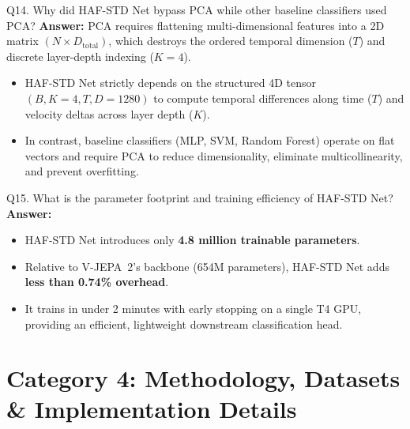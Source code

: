 \documentclass[a4paper, 11pt]{article}
\begin{document}
\begin{questionbox}{Q14. Why did HAF-STD Net bypass PCA while other baseline classifiers used PCA?}
\textbf{Answer:}
PCA requires flattening multi-dimensional features into a 2D matrix $(N \times D_{\text{total}})$, which destroys the ordered temporal dimension ($T$) and discrete layer-depth indexing ($K=4$). 
\begin{itemize}
    \item HAF-STD Net strictly depends on the structured 4D tensor $(B, K=4, T, D=1280)$ to compute temporal differences along time ($T$) and velocity deltas across layer depth ($K$).
    \item In contrast, baseline classifiers (MLP, SVM, Random Forest) operate on flat vectors and require PCA to reduce dimensionality, eliminate multicollinearity, and prevent overfitting.
\end{itemize}
\end{questionbox}

\begin{questionbox}{Q15. What is the parameter footprint and training efficiency of HAF-STD Net?}
\textbf{Answer:}
\begin{itemize}
    \item HAF-STD Net introduces only \textbf{4.8 million trainable parameters}.
    \item Relative to V-JEPA~2's backbone (654M parameters), HAF-STD Net adds \textbf{less than 0.74\% overhead}.
    \item It trains in under 2 minutes with early stopping on a single T4 GPU, providing an efficient, lightweight downstream classification head.
\end{itemize}
\end{questionbox}

\newpage
\section{Category 4: Methodology, Datasets \& Implementation Details}
\end{document}
